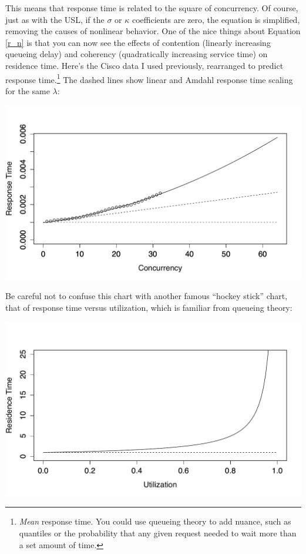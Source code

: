 \documentclass{vivid_layout}
\begin{document}
This means that response time is related to the square of concurrency.  Of
course, just as with the USL, if the $\sigma$ or $\kappa$ coefficients are zero,
the equation is simplified, removing the causes of nonlinear behavior. One of
the nice things about Equation \ref{r_n} is that you can now see the effects of
contention (linearly increasing queueing delay) and coherency (quadratically
increasing service time) on residence time.  Here's the Cisco data I used
previously, rearranged to predict response time.\footnote{{\itshape Mean}
response time. You could use queueing theory to add nuance, such as quantiles or
the probability that any given request needed to wait more than a set amount of
time.} The dashed lines show linear and Amdahl response time scaling for the
same $\lambda$:
\begin{center}
\includegraphics[width=.85\linewidth]{scalability/cisco-tput}
\end{center}


Be careful not to confuse this chart with another famous ``hockey stick'' chart,
that of response time versus utilization, which is familiar from queueing
theory:
\begin{center}
\includegraphics[width=.85\linewidth]{scalability/hockey}
\end{center}
\end{document}
